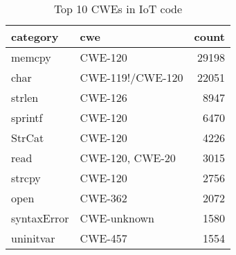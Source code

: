 \begin{table}
\caption{Top 10 CWEs in IoT code}
\begin{tabular}{llr}
\toprule
category & cwe & count \\
\midrule
memcpy & CWE-120 & 29198 \\
char & CWE-119!/CWE-120 & 22051 \\
strlen & CWE-126 & 8947 \\
sprintf & CWE-120 & 6470 \\
StrCat & CWE-120 & 4226 \\
read & CWE-120, CWE-20 & 3015 \\
strcpy & CWE-120 & 2756 \\
open & CWE-362 & 2072 \\
syntaxError & CWE-unknown & 1580 \\
uninitvar & CWE-457 & 1554 \\
\bottomrule
\end{tabular}
\end{table}
